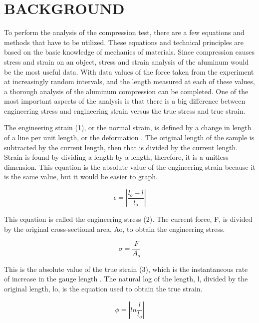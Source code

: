 \documentclass[12pt]{article}
\begin{document}
\section*{\fontsize{12}{12}\selectfont BACKGROUND}
To perform the analysis of the compression test, there are a few equations and methods that have to be utilized. These equations and technical principles are based on the basic knowledge of mechanics of materials. Since compression causes stress and strain on an object, stress and strain analysis of the aluminum would be the most useful data. With data values of the force taken from the experiment at increasingly random intervals, and the length measured at each of these values, a thorough analysis of the aluminum compression can be completed. One of the most important aspects of the analysis is that there is a big difference between engineering stress and engineering strain versus the true stress and true strain. 
\bigskip

The engineering strain (1), or the normal strain, is defined by a change in length of a line per unit length, or the deformation \cite{Hibbeler}. The original length of the sample is subtracted by the current length, then that is divided by the current length. Strain is found by dividing a length by a length, therefore, it is a unitless dimension. This equation is the absolute value of the engineering strain because it is the same value, but it would be easier to graph.

\bigskip
\begin{equation}
\epsilon = \left | \frac{l_{o}-l}{l_{o}} \right |
\end{equation}
\bigskip

This equation is called the engineering stress (2). The current force, F, is divided by the original cross-sectional area, Ao, to obtain the engineering stress. 
\bigskip

\begin{equation}
\sigma = \frac{F}{A_{o}}
\end{equation}
\bigskip

This is the absolute value of the true strain (3), which is the instantaneous rate of increase in the gauge length \cite{TrueStrain}. The natural log of the length, l, divided by the original length, lo, is the equation used to obtain the true strain. 
\bigskip

\begin{equation}
\phi = \left | ln\frac{l}{l_{o}} \right |
\end{equation}
\bigskip
\end{document}

